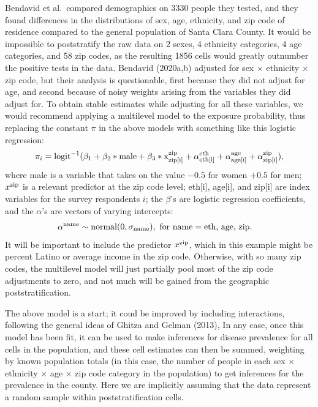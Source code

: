 \documentclass[11pt]{article}
\begin{document}
Bendavid et al.\ compared demographics on 3330 people they tested, and they found differences in the distributions of sex, age, ethnicity, and zip code of residence compared to the general population of Santa Clara County. It would be impossible to poststratify the raw data on 2 sexes, 4 ethnicity categories,  4 age categories, and 58 zip codes, as the resulting 1856 cells would greatly outnumber the positive tests in the data.  Bendavid (2020a,b) adjusted for sex $\times$ ethnicity $\times$ zip code, but their analysis is questionable, first because they did not adjust for age, and second because of noisy weights arising from the variables they did adjust for.
To obtain stable estimates while adjusting for all these variables, we would recommend applying a multilevel model to the exposure probability, thus replacing the constant $\pi$ in the above models with something like this logistic regression:
\begin{equation*}
\pi_i = \mbox{logit}^{-1}(\beta_1 + \beta_2*\rm{male} + \beta_3*x^{\rm zip}_{\rm zip[i]} + \alpha^{\rm eth}_{\rm eth[i]} + \alpha^{\rm age}_{\rm age[i]} + \alpha^{\rm zip}_{\rm zip[i]}),
\end{equation*}
where male is a variable that takes on the value $-0.5$ for women $+0.5$ for men; $x^{\rm zip}$ is a relevant predictor at the zip code level; eth[i], age[i], and zip[i] are index variables for the survey respondents $i$; the $\beta$'s are logistic regression coefficients, and the $\alpha$'s are vectors of varying intercepts:
\begin{align*}
  \alpha^{\rm name} &\sim \mbox{normal}(0, \sigma_{\rm name}),\mbox{ for } \mbox{name} = \mbox{eth, age, zip}.
\end{align*}
It will be important to include the predictor $x^{\rm zip}$, which in this example might be percent Latino or average income in the zip code.  Otherwise, with so many zip codes, the multilevel model will just partially pool most of the zip code adjustments to zero, and not much will be gained from the geographic poststratification.

The above model is a start; it coud be improved by including interactions, following the general ideas of Ghitza and Gelman (2013),  In any case, once this model has been fit, it can be used to make inferences for disease prevalence for all cells in the population, and these cell estimates can then be summed, weighting by known population totals (in this case, the number of people in each sex $\times$ ethnicity $\times$ age $\times$ zip code category in the population) to get inferences for the prevalence in the county.  Here we are implicitly assuming that the data represent a random sample within poststratification cells.
\end{document}
